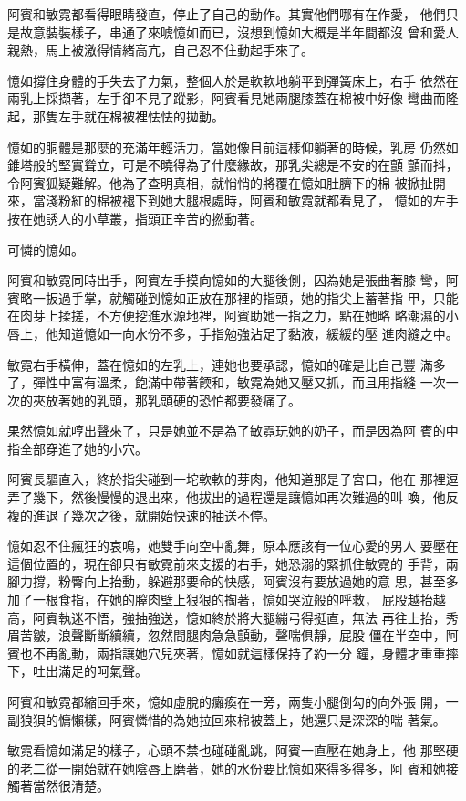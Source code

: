 阿賓和敏霓都看得眼睛發直，停止了自己的動作。其實他們哪有在作愛，
他們只是故意裝裝樣子，串通了來唬憶如而已，沒想到憶如大概是半年間都沒
曾和愛人親熱，馬上被激得情緒高亢，自己忍不住動起手來了。

憶如撐住身體的手失去了力氣，整個人於是軟軟地躺平到彈簧床上，右手
依然在兩乳上採擷著，左手卻不見了蹤影，阿賓看見她兩腿膝蓋在棉被中好像
彎曲而隆起，那隻左手就在棉被裡怯怯的拋動。

憶如的胴體是那麼的充滿年輕活力，當她像目前這樣仰躺著的時候，乳房
仍然如錐塔般的堅實聳立，可是不曉得為了什麼緣故，那乳尖總是不安的在顫
顫而抖，令阿賓狐疑難解。他為了查明真相，就悄悄的將覆在憶如肚臍下的棉
被掀扯開來，當淺粉紅的棉被褪下到她大腿根處時，阿賓和敏霓就都看見了，
憶如的左手按在她誘人的小草叢，指頭正辛苦的撚動著。

可憐的憶如。

阿賓和敏霓同時出手，阿賓左手摸向憶如的大腿後側，因為她是張曲著膝
彎，阿賓略一扳過手掌，就觸碰到憶如正放在那裡的指頭，她的指尖上蓄著指
甲，只能在肉芽上揉搓，不方便挖進水源地裡，阿賓助她一指之力，點在她略
略潮濕的小唇上，他知道憶如一向水份不多，手指勉強沾足了黏液，緩緩的壓
進肉縫之中。

敏霓右手橫伸，蓋在憶如的左乳上，連她也要承認，憶如的確是比自己豐
滿多了，彈性中富有溫柔，飽滿中帶著餪和，敏霓為她又壓又抓，而且用指縫
一次一次的夾放著她的乳頭，那乳頭硬的恐怕都要發痛了。

果然憶如就哼出聲來了，只是她並不是為了敏霓玩她的奶子，而是因為阿
賓的中指全部穿進了她的小穴。

阿賓長驅直入，終於指尖碰到一坨軟軟的芽肉，他知道那是子宮口，他在
那裡逗弄了幾下，然後慢慢的退出來，他拔出的過程還是讓憶如再次難過的叫
喚，他反複的進退了幾次之後，就開始快速的抽送不停。

憶如忍不住瘋狂的哀鳴，她雙手向空中亂舞，原本應該有一位心愛的男人
要壓在這個位置的，現在卻只有敏霓前來支援的右手，她恐溺的緊抓住敏霓的
手背，兩腳力撐，粉臀向上抬動，躲避那要命的快感，阿賓沒有要放過她的意
思，甚至多加了一根食指，在她的膣肉壁上狠狠的掏著，憶如哭泣般的呼救，
屁股越抬越高，阿賓執迷不悟，強抽強送，憶如終於將大腿繃弓得挺直，無法
再往上抬，秀眉苦皺，浪聲斷斷續續，忽然間腿肉急急顫動，聲喘俱靜，屁股
僵在半空中，阿賓也不再亂動，兩指讓她穴兒夾著，憶如就這樣保持了約一分
鐘，身體才重重摔下，吐出滿足的呵氣聲。

阿賓和敏霓都縮回手來，憶如虛脫的癱瘓在一旁，兩隻小腿倒勾的向外張
開，一副狼狽的慵懶樣，阿賓憐惜的為她拉回來棉被蓋上，她還只是深深的喘
著氣。

敏霓看憶如滿足的樣子，心頭不禁也碰碰亂跳，阿賓一直壓在她身上，他
那堅硬的老二從一開始就在她陰唇上磨著，她的水份要比憶如來得多得多，阿
賓和她接觸著當然很清楚。

